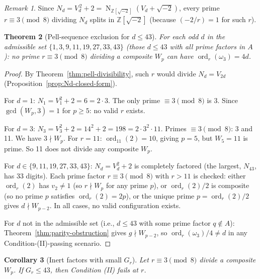 \documentclass[12pt]{article}
\theoremstyle{plain}
\newtheorem{theorem}{Theorem}[section]
\newtheorem{corollary}[theorem]{Corollary}
\theoremstyle{definition}
\theoremstyle{remark}
\newtheorem{remark}[theorem]{Remark}
\begin{document}
\begin{remark}\label{rem:Nd-norm}
Since \(N_d = V_d^{\,2} + 2 = \operatorname{N}_{\mathbb{Z}[\sqrt{-2}]}(V_d + \sqrt{-2})\),
every prime \(r \equiv 3 \pmod{8}\) dividing \(N_d\) splits in
\(\mathbb{Z}[\sqrt{-2}]\) (because \((-2/r) = 1\) for such \(r\)).
\end{remark}


\begin{theorem}[{Pell-sequence exclusion for $d \leq 43$}]\label{thm:pell-exclusion}
For each odd \(d\) in the admissible set
\(\{1, 3, 9, 11, 19, 27, 33, 43\}\) (those \(d \leq 43\) with
all prime factors in \(A\)): no prime \(r \equiv 3 \pmod{8}\)
dividing a composite \(W_p\) can have
\(\operatorname{ord}_r(\omega_3) = 4d\).
\end{theorem}


\begin{proof}
By Theorem~\ref{thm:pell-divisibility}, such \(r\) would divide
\(N_d = V_{2d}\) (Proposition~\ref{prop:Nd-closed-form}).

For \(d = 1\): \(N_1 = V_1^2 + 2 = 6 = 2 \cdot 3\). The only prime
\(\equiv 3 \pmod{8}\) is 3. Since \(\gcd(W_p, 3) = 1\) for
\(p \geq 5\): no valid \(r\) exists.

For \(d = 3\): \(N_3 = V_3^2 + 2 = 14^2 + 2 = 198 = 2 \cdot 3^2 \cdot 11\). Primes
\(\equiv 3 \pmod{8}\): 3 and 11. We have \(3 \nmid W_p\). For
\(r = 11\): \(\operatorname{ord}_{11}(2) = 10\), giving \(p = 5\),
but \(W_5 = 11\) is prime. So 11 does not divide any composite \(W_p\).

For \(d \in \{9, 11, 19, 27, 33, 43\}\): \(N_d = V_d^2 + 2\) is
completely factored (the largest, \(N_{43}\), has 33 digits). Each
prime factor \(r \equiv 3 \pmod{8}\) with \(r > 11\) is checked:
either \(\operatorname{ord}_r(2)\) has \(v_2 \neq 1\) (so
\(r \nmid W_p\) for any prime \(p\)), or
\(\operatorname{ord}_r(2)/2\) is composite (so no prime \(p\)
satisfies \(\operatorname{ord}_r(2) = 2p\)), or the unique prime
\(p = \operatorname{ord}_r(2)/2\) gives \(d \nmid W_{p-2}\).
In all cases, no valid configuration exists.

For \(d\) not in the admissible set (i.e., \(d \leq 43\) with some
prime factor \(q \notin A\)): Theorem~\ref{thm:parity-obstruction} gives
\(g \nmid W_{p-2}\), so \(\operatorname{ord}_r(\omega_3)/4 \neq d\)
in any Condition-(II)-passing scenario.
\end{proof}
\begin{corollary}[{Inert factors with small $G_r$}]\label{cor:small-Gr}
Let
\(r \equiv 3 \pmod{8}\) divide a composite \(W_p\). If
\(G_r \leq 43\), then Condition (II) fails at \(r\).
\end{corollary}
\end{document}

